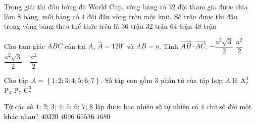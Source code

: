 \begin{ex}%
	Trong giải thi đấu bóng đá World Cup, vòng bảng có $32$ đội tham gia được chia làm $8$ bảng, mỗi bảng có $4$ đội đấu vòng tròn một lượt. Số trận được thi đấu trong vòng bảng theo thể thức trên là
	\choice
	{$36$ trận}
	{$32$ trận}
	{$64$ trận}
	{\True $48$ trận}
\end{ex}

\begin{ex}%
	Cho tam giác $ABC$ cân tại $A$, $\widehat{A} = 120^\circ$ và $AB = a$. Tính $\overrightarrow{AB}\cdot \overrightarrow{AC}$.
	\choice
	{$-\dfrac{a^2\sqrt{3}}{2}$}
	{$\dfrac{a^2}{2}$}
	{$\dfrac{a^2\sqrt{3}}{2}$}
	{\True $-\dfrac{a^2}{2}$}
\end{ex}

\begin{ex}%
	Cho tập $A = \left\lbrace 1;2;3;4;5;6;7 \right\rbrace $. Số tập con gồm $3$ phần tử của tập hợp $A$ là
	\choice
	{$\mathrm{A}^{3}_{7}$}
	{$\mathrm{P}_{3}$}
	{$\mathrm{P}_{7}$}
	{\True $\mathrm{C}^{3}_{7}$}
\end{ex}

\begin{ex}%
	Từ các số $1$; $2$; $3$; $4$; $5$; $6$; $7$; $8$ lập được bao nhiêu số tự nhiên có $4$ chữ số đôi một khác nhau?
	\choice
	{$40320$}
	{$4096$}
	{$65536$}
	{\True $1680$}
\end{ex}

